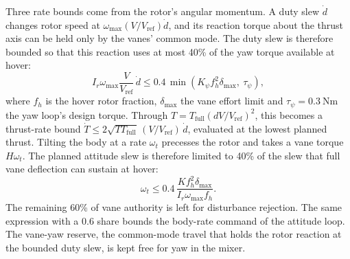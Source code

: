 \documentclass[journal]{IEEEtran}
\newcommand{\Ir}{I_r}
\newcommand{\wmax}{\omega_{\max}}
\begin{document}
Three rate bounds come from the rotor's angular momentum.
A duty slew $\dot d$ changes rotor speed at $\wmax(V/V_{\text{ref}})\dot d$, and its reaction torque about the thrust axis can be held only by the vanes' common mode.
The duty slew is therefore bounded so that this reaction uses at most 40\% of the yaw torque available at hover:
\begin{equation}
\Ir\wmax\frac{V}{V_{\text{ref}}}\,\dot d \le 0.4\,\min\!\left(K_\psi f_h^2\delta_{\max},\ \tau_{\psi}\right),
\label{eq:dutyrate}
\end{equation}
where $f_h$ is the hover rotor fraction, $\delta_{\max}$ the vane effort limit and $\tau_\psi = \SI{0.3}{\newton\metre}$ the yaw loop's design torque.
Through $T = T_{\text{full}}(d V/V_{\text{ref}})^2$, this becomes a thrust-rate bound $\dot T \le 2\sqrt{T T_{\text{full}}}\,(V/V_{\text{ref}})\,\dot d$, evaluated at the lowest planned thrust.
Tilting the body at a rate $\omega_t$ precesses the rotor and takes a vane torque $H\omega_t$.
The planned attitude slew is therefore limited to 40\% of the slew that full vane deflection can sustain at hover:
\begin{equation}
\omega_t \le 0.4\,\frac{K f_h^2\delta_{\max}}{\Ir\wmax f_h} .
\label{eq:tiltrate}
\end{equation}
The remaining 60\% of vane authority is left for disturbance rejection.
The same expression with a 0.6 share bounds the body-rate command of the attitude loop.
The vane-yaw reserve, the common-mode travel that holds the rotor reaction at the bounded duty slew, is kept free for yaw in the mixer.
\end{document}

